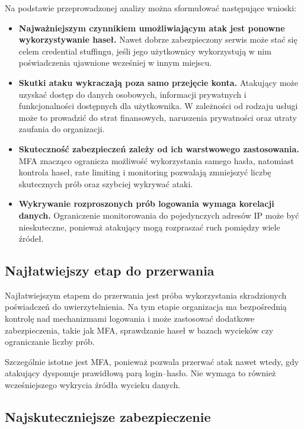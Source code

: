 \documentclass[12pt,a4paper]{article}
\begin{document}
Na podstawie przeprowadzonej analizy można sformułować następujące wnioski:

\begin{itemize}
    \item \textbf{Najważniejszym czynnikiem umożliwiającym atak jest ponowne wykorzystywanie haseł.} Nawet dobrze zabezpieczony serwis może stać się celem credential stuffingu, jeśli jego użytkownicy wykorzystują w nim poświadczenia ujawnione wcześniej w innym miejscu.

    \item \textbf{Skutki ataku wykraczają poza samo przejęcie konta.} Atakujący może uzyskać dostęp do danych osobowych, informacji prywatnych i funkcjonalności dostępnych dla użytkownika. W zależności od rodzaju usługi może to prowadzić do strat finansowych, naruszenia prywatności oraz utraty zaufania do organizacji.

    \item \textbf{Skuteczność zabezpieczeń zależy od ich warstwowego zastosowania.} MFA znacząco ogranicza możliwość wykorzystania samego hasła, natomiast kontrola haseł, rate limiting i monitoring pozwalają zmniejszyć liczbę skutecznych prób oraz szybciej wykrywać ataki.

    \item \textbf{Wykrywanie rozproszonych prób logowania wymaga korelacji danych.} Ograniczenie monitorowania do pojedynczych adresów IP może być nieskuteczne, ponieważ atakujący mogą rozpraszać ruch pomiędzy wiele źródeł.
\end{itemize}

\subsection{Najłatwiejszy etap do przerwania}

Najłatwiejszym etapem do przerwania jest próba wykorzystania skradzionych poświadczeń do uwierzytelnienia. Na tym etapie organizacja ma bezpośrednią kontrolę nad mechanizmami logowania i może zastosować dodatkowe zabezpieczenia, takie jak MFA, sprawdzanie haseł w bazach wycieków czy ograniczanie liczby prób.

Szczególnie istotne jest MFA, ponieważ pozwala przerwać atak nawet wtedy, gdy atakujący dysponuje prawidłową parą login--hasło. Nie wymaga to również wcześniejszego wykrycia źródła wycieku danych.

\subsection{Najskuteczniejsze zabezpieczenie}
\end{document}

